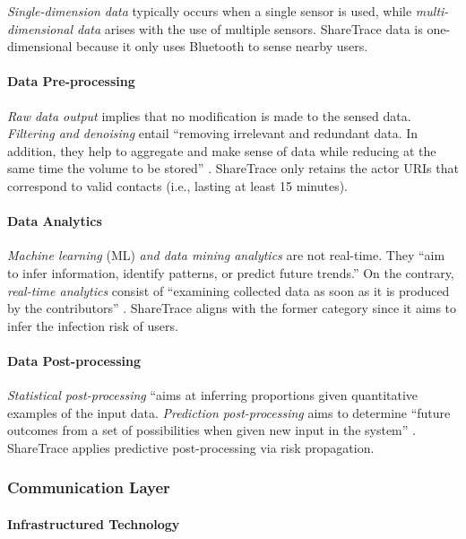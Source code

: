 \emph{Single-dimension data} typically occurs when a single sensor is used, while \emph{multi-dimensional data} arises with the use of multiple sensors. ShareTrace data is one-dimensional because it only uses Bluetooth to sense nearby users.

\paragraph{Data Pre-processing}

\emph{Raw data output} implies that no modification is made to the sensed data. \emph{Filtering and denoising} entail ``removing irrelevant and redundant data. In addition, they help to aggregate and make sense of data while reducing at the same time the volume to be stored'' \citep{Capponi2019}. ShareTrace only retains the actor URIs that correspond to valid contacts (i.e., lasting at least 15 minutes).

\paragraph{Data Analytics}

\emph{Machine learning} (ML) \emph{and data mining analytics} are not real-time. They ``aim to infer information, identify patterns, or predict future trends.'' On the contrary, \emph{real-time analytics} consist of ``examining collected data as soon as it is produced by the contributors'' \citep{Capponi2019}. ShareTrace aligns with the former category since it aims to infer the infection risk of users.

\paragraph{Data Post-processing}

\emph{Statistical post-processing} ``aims at inferring proportions given quantitative examples of the input data. \emph{Prediction post-processing} aims to determine ``future outcomes from a set of possibilities when given new input in the system'' \citep{Capponi2019}. ShareTrace applies predictive post-processing via risk propagation.

\subsubsection{Communication Layer}

\paragraph{Infrastructured Technology}

